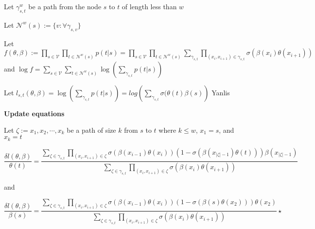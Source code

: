 \documentclass[12pt,a4paper,oneside]{article}
\begin{document}
Let $\gamma_{s,t}^{w}$ be a path from the node $s$ to $t$ of length less than $w$


Let $\mathcal{N}^w(s) := \{v: \forall \gamma_{s,v}\}$


Let $f(\theta, \beta) := \prod_{s \in \mathcal{V}}\prod_{t\in \mathcal{N}^{w}(s)}p(t | s) = \prod_{s \in \mathcal{V}}\prod_{t\in \mathcal{N}^{w}(s)}\sum_{\gamma_{s, t}}\prod_{(x_i,x_{i+1})\in \gamma_{s, t}}\sigma(\beta(x_i)\theta(x_{i+1}))$ \\
and $\log f = \sum_{s \in \mathcal{V}}\sum_{t\in \mathcal{N}^{w}(s)}\log\left( \sum_{\gamma_{s, t}}p(t | s) \right)$


Let $l_{s,t}(\theta, \beta)  = \log\left( \sum_{\gamma_{s, t}}p(t | s) \right) = log\left( \sum_{\gamma_{s, t}} \sigma(\theta(t)\beta(s) \right)$ Yanlis


\textbf{Update equations}

Let $\zeta := x_1,x_2,\cdots, x_k$ be a path of size $k$ from $s$ to $t$ where $k \leq w$, $x_1 = s$, and $x_k=t$ 

$$
\frac{\delta l(\theta, \beta)}{\theta(t)} = \frac{ \sum_{\zeta \in \gamma_{s,t}}\prod_{(x_i,x_{i+1})\in \zeta} \sigma(\beta(x_{i-1})\theta(x_i))(1-\sigma(\beta(x_{|\zeta|-1})\theta(t)))\beta(x_{|\zeta|-1}) }{ \sum_{\zeta \in \gamma_{s,t}}\prod_{(x_i,x_{i+1})\in \zeta}\sigma(\beta(x_i)\theta(x_{i+1})) }
$$

and

$$
\frac{\delta l(\theta, \beta)}{\beta(s)} = \frac{ \sum_{\zeta \in \gamma_{s,t}}\prod_{(x_i,x_{i+1})\in \zeta} \sigma(\beta(x_{i-1})\theta(x_i))(1-\sigma(\beta(s)\theta(x_2)))\theta(x_{2}) }{ \sum_{\zeta \in \gamma_{s,t}}\prod_{(x_i,x_{i+1})\in \zeta}\sigma(\beta(x_i)\theta(x_{i+1})) } \star$$ 
\end{document}
